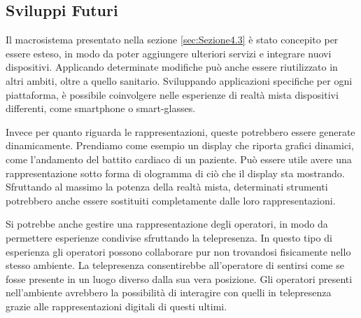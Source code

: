 \subsection{Sviluppi Futuri}
Il macrosistema presentato nella sezione \ref{sec:Sezione4.3} è stato concepito per essere esteso, in modo da poter aggiungere ulteriori servizi e integrare nuovi dispositivi.
Applicando determinate modifiche può anche essere riutilizzato in altri ambiti, oltre a quello sanitario.
Sviluppando applicazioni specifiche per ogni piattaforma, è possibile coinvolgere nelle esperienze di realtà mista dispositivi differenti, come smartphone o smart-glasses.

Invece per quanto riguarda le rappresentazioni, queste potrebbero essere generate dinamicamente.
Prendiamo come esempio un display che riporta grafici dinamici, come l'andamento del battito cardiaco di un paziente.
Può essere utile avere una rappresentazione sotto forma di ologramma di ciò che il display sta mostrando.
Sfruttando al massimo la potenza della realtà mista, determinati strumenti potrebbero anche essere sostituiti completamente dalle loro rappresentazioni.

Si potrebbe anche gestire una rappresentazione degli operatori, in modo da permettere esperienze condivise sfruttando la telepresenza. In questo tipo di esperienza gli operatori possono collaborare pur non trovandosi fisicamente nello stesso ambiente.
La telepresenza consentirebbe all'operatore di sentirsi come se fosse presente in un luogo diverso dalla sua vera posizione.
Gli operatori presenti nell'ambiente avrebbero la possibilità di interagire con quelli in telepresenza grazie alle rappresentazioni digitali di questi ultimi.
